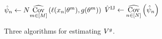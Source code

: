 \begin{figure}
\begin{algorithm}[H]
        \begin{algorithmic}
            \State $\hat{\psi}_n \gets N
                \underset{m \in [M]}{\widehat{\mathrm{Cov}}}\left(\ell(x_n \vert \theta^m), g(\theta^m)\right)$
        \EndFor
        \State \Return $\hat{V}^{\mathrm{IJ}} \gets \underset{n\in [N]}{\widehat{\mathrm{Cov}}}\left(\hat{\psi}_n\right)$
        \end{algorithmic}
    \end{algorithm}
        
    
    \caption{Three algorithms for estimating $V^g$.}
    \end{figure}
